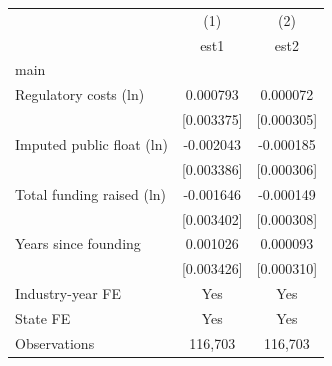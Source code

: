 {
\def\sym#1{\ifmmode^{#1}\else\(^{#1}\)\fi}
\begin{tabular*}{/hsize}{@{\hskip\tabcolsep\extracolsep\fill}l*{2}{c}}
\hline\hline
                    &\multicolumn{1}{c}{(1)}&\multicolumn{1}{c}{(2)}\\
                    &\multicolumn{1}{c}{est1}&\multicolumn{1}{c}{est2}\\
\hline
main                &                     &                     \\
Regulatory costs (ln)&    0.000793         &    0.000072         \\
                    &  [0.003375]         &  [0.000305]         \\
[1em]
Imputed public float (ln)&   -0.002043         &   -0.000185         \\
                    &  [0.003386]         &  [0.000306]         \\
[1em]
Total funding raised (ln)&   -0.001646         &   -0.000149         \\
                    &  [0.003402]         &  [0.000308]         \\
[1em]
Years since founding&    0.001026         &    0.000093         \\
                    &  [0.003426]         &  [0.000310]         \\
\hline
Industry-year FE    &         Yes         &         Yes         \\
State FE            &         Yes         &         Yes         \\
Observations        &     116,703         &     116,703         \\
\hline\hline
\end{tabular*}
}
